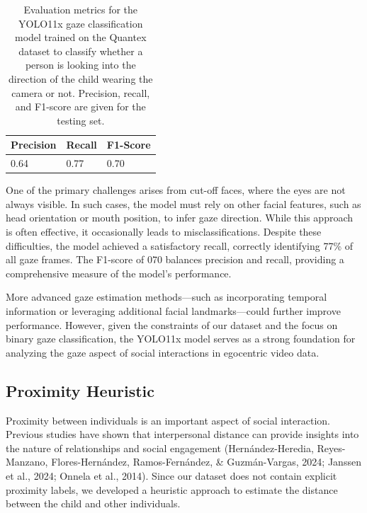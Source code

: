 \documentclass[
  man,floatsintext]{apa6}
\begin{document}
\begin{table}[tbp]

\begin{center}
\begin{threeparttable}

\caption{\label{tab:gaze-metrics}Evaluation metrics for the YOLO11x gaze classification model trained on the Quantex dataset to classify whether a person is looking into the direction of the child wearing the camera or not. Precision, recall, and F1-score are given for the testing set.}

\begin{tabular}{lll}
\toprule
Precision & \multicolumn{1}{c}{Recall} & \multicolumn{1}{c}{F1-Score}\\
\midrule
0.64 & 0.77 & 0.70\\
\bottomrule
\end{tabular}

\end{threeparttable}
\end{center}

\end{table}

One of the primary challenges arises from cut-off faces, where the eyes are not always visible. In such cases, the model must rely on other facial features, such as head orientation or mouth position, to infer gaze direction. While this approach is often effective, it occasionally leads to misclassifications. Despite these difficulties, the model achieved a satisfactory recall, correctly identifying 77\% of all gaze frames. The F1-score of 070 balances precision and recall, providing a comprehensive measure of the model's performance.

More advanced gaze estimation methods---such as incorporating temporal information or leveraging additional facial landmarks---could further improve performance. However, given the constraints of our dataset and the focus on binary gaze classification, the YOLO11x model serves as a strong foundation for analyzing the gaze aspect of social interactions in egocentric video data.

\subsection{Proximity Heuristic}\label{proximity-heuristic}

Proximity between individuals is an important aspect of social interaction. Previous studies have shown that interpersonal distance can provide insights into the nature of relationships and social engagement (Hernández-Heredia, Reyes-Manzano, Flores-Hernández, Ramos-Fernández, \& Guzmán-Vargas, 2024; Janssen et al., 2024; Onnela et al., 2014). Since our dataset does not contain explicit proximity labels, we developed a heuristic approach to estimate the distance between the child and other individuals.
\end{document}
